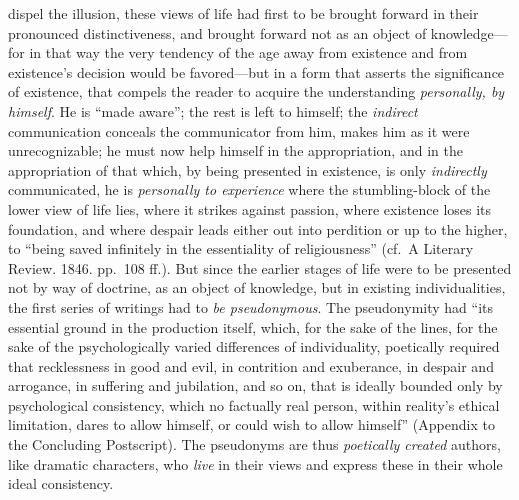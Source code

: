 \documentclass[12pt,a4paper]{article}
\begin{document}
dispel the illusion, these views of life had first to be brought forward in their
pronounced distinctiveness, and brought forward not as an object of
knowledge---for in that way the very tendency of the age away from existence and
from existence's decision would be favored---but in a form that asserts the
significance of existence, that compels the reader to acquire the understanding
\emph{personally, by himself}. He is ``made aware''; the rest is left to himself; the
\emph{indirect} communication conceals the communicator from him, makes him as it were
unrecognizable; he must now help himself in the appropriation, and in the
appropriation of that which, by being presented in existence, is only \emph{indirectly}
communicated, he is \emph{personally to experience} where the stumbling-block of the
lower view of life lies, where it strikes against passion, where existence loses
its foundation, and where despair leads either out into perdition or up to the
higher, to ``being saved infinitely in the essentiality of religiousness'' (cf.\ A
Literary Review. 1846. pp.\ 108 ff.). But since the earlier stages of life were to
be presented not by way of doctrine, as an object of knowledge, but in existing
individualities, the first series of writings had to \emph{be pseudonymous}. The
pseudonymity had ``its essential ground in the production itself, which, for the
sake of the lines, for the sake of the psychologically varied differences of
individuality, poetically required that recklessness in good and evil, in
contrition and exuberance, in despair and arrogance, in suffering and jubilation,
and so on, that is ideally bounded only by psychological consistency, which no
factually real person, within reality's ethical limitation, dares to allow
himself, or could wish to allow himself'' (Appendix to the Concluding Postscript).
The pseudonyms are thus \emph{poetically created} authors, like dramatic characters, who
\emph{live} in their views and express these in their whole ideal consistency.
\end{document}
